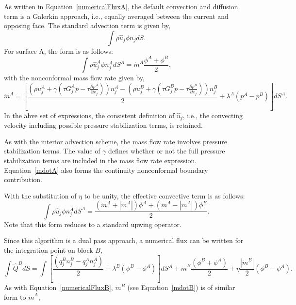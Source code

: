 {As written in Equation~\ref{numericalFluxA}, the default convection and diffusion term is a
Galerkin approach, i.e., equally averaged between the current and opposing face. The standard 
advection term is given by,
\begin{equation} 
        \int \rho \hat{u}_j \phi n_j dS.
\label{advection}
\end{equation}
For surface A, the form is as follows:
\begin{equation} 
        \int \rho \hat{u}_j^A \phi n_j^A dS^A = \dot m^A \frac{ \phi^A + \phi^B}{2},
\label{advection}
\end{equation}
with the nonconformal mass flow rate given by,
\begin{equation} 
        \dot {m}^A = [\frac{(\rho u_j^A + \gamma(\tau G_j^A p -\tau \frac{\partial p^A}{\partial x_j}))n_j^A
        				       - (\rho u_j^B + \gamma(\tau G_j^B p -\tau \frac{\partial p^B}{\partial x_j}))n_j^B}{2}
				       + \lambda^A ( p^A - p^B)] dS^A.
\label{mdotA}
\end{equation}
In the abve set of expressions, the consistent definition of $\hat{u}_j$, i.e., the convecting velocity including
possible pressure stabilization terms, is retained.

As with the interior advection scheme, the mass flow rate involves pressure stabilization terms. The value of 
$\gamma$ defines whether or not the full pressure stabilization terms are included in the mass flow rate expression.
Equation~\ref{mdotA} also forms the continuity nonconformal boundary contribution. 

With the substitution of $\eta$ to be unity, the effective convective term is as follows:
\begin{equation} 
        \int \rho \hat{u}_j \phi n_j^A dS^A = \frac{ (\dot m^A + |\dot m^A|) \phi^A +  (\dot m^A - |\dot m^A|)\phi^B}{2}.
\label{advectionAUPW}
\end{equation}
Note that this form reduces to a standard upwing operator.

Since this algorithm is a dual pass approach, a numerical flux can be written for the integration 
point on block $B$,
\begin{equation} 
        \int \hat Q^B dS = \int [\frac{(q_j^B n_j^B - q_j^A n_j^A)}{2}
				+ \lambda^B ( \phi^B - \phi^A) ]dS^A
        				+ \dot m^B \frac{(\phi^B + \phi^A)}{2} 
                                        + \eta \frac{|\dot{m}^B|}{2} (\phi^B - \phi^A).
\label{numericalFluxB}
\end{equation}
As with Equation~\ref{numericalFluxB}, $\dot{m}^B$ (see Equation~\ref{mdotB}) 
is of similar form to $\dot{m}^A$,

}
